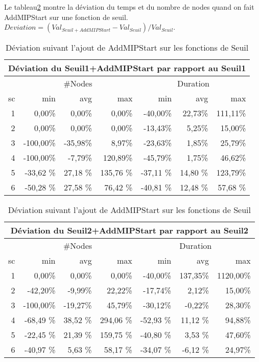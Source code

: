 \documentclass[twoside,fleqn]{EPURapport}
\begin{document}
Le tableau\ref{tab_cut2_ams2_tab1} montre la déviation du temps et du nombre de nodes quand on fait AddMIPStart sur une fonction de seuil. $Deviation = (Val_{Seuil+AddMIPStart}-Val_{Seuil})/Val_{Seuil}$.
\begin{table}[h]
    \centering
    \begin{tabular}{|r|r|r|r|r|r|r|}
    	\hline
    	\multicolumn{7}{|c|}{Déviation du Seuil1+AddMIPStart par rapport au Seuil1 }	\\ \hline
&\multicolumn{3}{c|}{\#Nodes} &\multicolumn{3}{c|}{Duration}	\\ \hline
sc&min	    &avg	    & max	  &min	    &avg	   & max \\ \hline
1&	0,00\%&0,00\%&0,00\%&	-40,00\%&	22,73\%&111,11\%    \\ \hline
2&	0,00\%&0,00\%&0,00\%&	-13,43\%&	5,25\%&	15,00\%     \\ \hline
3&	-100,00\%&-35,98\%&8,97\%&	-23,63\%&	1,85\%&	25,79\%  \\ \hline
4 &-100,00\% &-7,79\% &120,89\% &-45,79\% &1,75\% &46,62\%  \\ \hline
5&-33,62	\%&27,18	\%&135,76 \%&	-37,11	\%&14,80	\%&123,79\%     \\ \hline
6&-50,28	\%&27,58	\%&76,42	\%&-40,81	\%&12,48	\%&57,68 \%     \\ \hline
    \end{tabular}
\medskip \par
    \begin{tabular}{|r|r|r|r|r|r|r|}
    	\hline
    	\multicolumn{7}{|c|}{Déviation du Seuil2+AddMIPStart par rapport au Seuil2 }	\\ \hline
&\multicolumn{3}{c|}{\#Nodes} &\multicolumn{3}{c|}{Duration}	\\ \hline
sc&min	    &avg	    & max	  &min	    &avg	   & max \\ \hline
1&	   0,00\%&	  0,00\%&	 0,00\%&	-40,00\%&	137,35\%&	1120,00\%    \\ \hline
2&	 -42,20\%&	 -9,99\%&	22,22\%&	-17,74\%&	  2,12\%&	  15,00\%     \\ \hline
3&	-100,00\%&	-19,27\%&	45,79\%&	-30,12\%&	 -0,22\%&	  28,30\%  \\ \hline
4&-68,49	\%&38,52	\%&294,06	\%&-52,93	\%&11,12	\%&94,88\%     \\ \hline
5&-22,45	\%&21,39	\%&159,75	\%&-40,80	\%&3,53	    \%&47,60\%     \\ \hline
6&-40,97	\%&5,63	    \%&58,17	\%&-34,07	\%&-6,12	\%&24,97\%     \\ \hline
    \end{tabular}
    \caption{Déviation suivant l'ajout de AddMIPStart sur les fonctions de Seuil}
    \label{tab_cut2_ams2_tab1}
\end{table}
\end{document}
